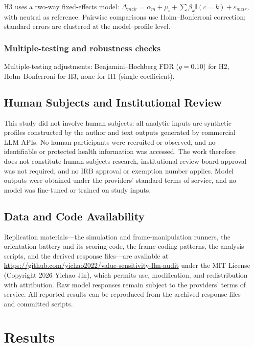 \documentclass[12pt,a4paper]{article}
\begin{document}
H3 uses a two-way fixed-effects model: \(\Delta_{mcir} = \alpha_m + \mu_i + \sum \beta_k \mathbb{I}(c=k) + \varepsilon_{mcir}\), with neutral as reference. Pairwise comparisons use Holm--Bonferroni correction; standard errors are clustered at the model--profile level.

\subsubsection{Multiple-testing and robustness checks}
\label{sec:robustness}

Multiple-testing adjustments: Benjamini--Hochberg FDR (\(q=0.10\)) for H2, Holm--Bonferroni for H3, none for H1 (single coefficient).

\subsection{Human Subjects and Institutional Review}
\label{sec:human-subjects}

This study did not involve human subjects: all analytic inputs are synthetic profiles constructed by the author and text outputs generated by commercial LLM APIs. No human participants were recruited or observed, and no identifiable or protected health information was accessed. The work therefore does not constitute human-subjects research, institutional review board approval was not required, and no IRB approval or exemption number applies. Model outputs were obtained under the providers' standard terms of service, and no model was fine-tuned or trained on study inputs.

\subsection{Data and Code Availability}

Replication materials---the simulation and frame-manipulation runners, the orientation battery and its scoring code, the frame-coding patterns, the analysis scripts, and the derived response files---are available at \url{https://github.com/yichao2022/value-sensitivity-llm-audit} under the MIT License (Copyright 2026 Yichao Jin), which permits use, modification, and redistribution with attribution. Raw model responses remain subject to the providers' terms of service. All reported results can be reproduced from the archived response files and committed scripts.

\section{Results}
\end{document}
